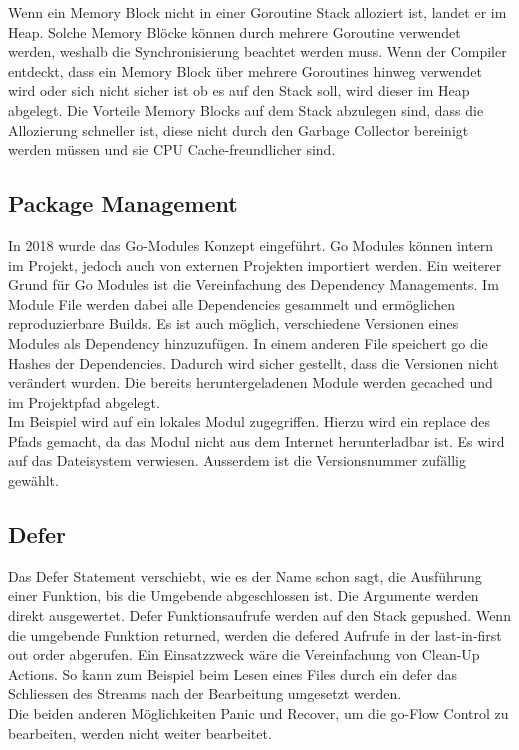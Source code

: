 \documentclass[12pt,titlepage]{article}
\begin{document}
Wenn ein Memory Block nicht in einer Goroutine Stack alloziert ist, landet er im Heap.
Solche Memory Blöcke können durch mehrere Goroutine verwendet werden, weshalb die Synchronisierung beachtet werden muss.
Wenn der Compiler entdeckt, dass ein Memory Block über mehrere Goroutines hinweg verwendet wird oder sich nicht sicher ist ob es auf den Stack soll, wird dieser im Heap abgelegt.
Die Vorteile Memory Blocks auf dem Stack abzulegen sind, dass die Allozierung schneller ist, diese nicht durch den Garbage Collector bereinigt werden müssen und sie CPU Cache-freundlicher sind.

\subsection{Package Management}
In 2018 wurde das Go-Modules Konzept eingeführt. Go Modules können intern im Projekt, jedoch auch von externen Projekten importiert werden. Ein weiterer Grund für Go Modules ist die Vereinfachung des Dependency Managements. Im Module File werden dabei alle Dependencies gesammelt und ermöglichen reproduzierbare Builds. Es ist auch möglich, verschiedene Versionen eines Modules als Dependency hinzuzufügen. In einem anderen File speichert go die Hashes der Dependencies. Dadurch wird sicher gestellt, dass die Versionen nicht verändert wurden. Die bereits heruntergeladenen Module werden gecached und im Projektpfad abgelegt. \\
Im Beispiel wird auf ein lokales Modul zugegriffen. Hierzu wird ein replace des Pfads gemacht, da das Modul nicht aus dem Internet herunterladbar ist. Es wird auf das Dateisystem verwiesen. Ausserdem ist die Versionsnummer zufällig gewählt. 

\subsection{Defer}
Das Defer Statement verschiebt, wie es der Name schon sagt, die Ausführung einer Funktion, bis die Umgebende abgeschlossen ist. Die Argumente werden direkt ausgewertet. Defer Funktionsaufrufe werden auf den Stack gepushed. Wenn die umgebende Funktion returned, werden die defered Aufrufe in der last-in-first out order abgerufen. Ein Einsatzzweck wäre die Vereinfachung von Clean-Up Actions. So kann zum Beispiel beim Lesen eines Files durch ein defer das Schliessen des Streams nach der Bearbeitung umgesetzt werden. \\Die beiden anderen Möglichkeiten Panic und Recover, um die go-Flow Control zu bearbeiten, werden nicht weiter bearbeitet. 
\end{document}

